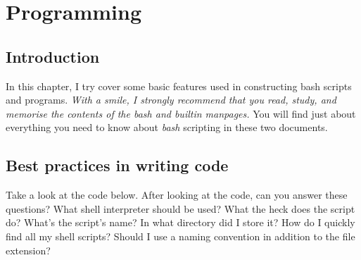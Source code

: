 \chapter{Programming}
\pagestyle{fancy}

\fancyhf{} %
\fancyhead[OC]{\leftmark} %
\setlength{\headheight}{13.99pt} 
\cfoot{\thepage} %
		

\section{Introduction}

In this chapter, I try cover some basic features used in constructing bash scripts and programs.  \textit{With a smile, I strongly recommend that you read, study, and memorise the contents of the \emph{bash} and \emph{builtin} manpages.} You will find just about everything you need to know about \emph{bash} scripting in these two documents.

\section{Best practices in writing code}

Take a look at the code below. After looking at the code, can you answer these questions? What shell interpreter should be used? What the heck does the script do? What's the script's name? In what directory did I store it? How do I quickly find all my shell scripts? Should I use a naming convention in addition to the file extension?

